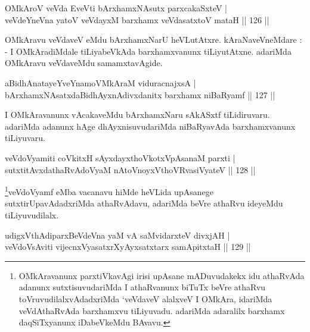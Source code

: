 

\begin{shl}
OMkAroV veVda EveVti bArxhamxNAsutx parxcakaSxteV  | \\
veVdeYneVna yatoV veVdayxM barxhamx veVdasatxtoV mataH \hfill||  126 ||  
\end{shl}

\begin{artha}
OMkAravu veVdaveV eMdu bArxhamxNarU heVLutAtxre. kAraNaveVneMdare : - I OMkAradiMdale tiLiyabeVkAda barxhamxvanunx tiLiyutAtxne. adariMda OMkAravu veVdaveMdu samamxtavAgide.
\end{artha}

\begin{shl}
aBidhAnatayeYveYnamoVMkAraM viduracnajxsA  | \\
bArxhamxNAsatxdaBidhAyxnAdivxdanitx barxhamx niBaRyamf \hfill||  127 ||  
\end{shl}

\begin{artha}
I OMkAravanunx vAcakaveMdu bArxhamxNaru sAkASxtf tiLidiruvaru. adariMda adanunx hAge dhAyxnisuvudariMda niBaRyavAda barxhamxvanunx tiLiyuvaru.
\end{artha}


\begin{shl}
veVdoV\s yamiti coVkitxH sAyxdayxthoVkotxVpAsanaM parxti  | \\
sutxtitAvxdathaRvAdoV\s yaM nAtoV\s noyxV\s thoVR\s vasiVyateV \hfill||  128 ||  
\end{shl}

\begin{artha}
\footnote{OMkAravanunx parxtiVkavAgi irisi upAsane mADuvudakekx idu athaRvAda adanunx sutxtisuvudariMda I athaRvanunx biTuTx beVre athaRvu toVruvudilalxvAdadxriMda `veVdaveV alalxveV I OMkAra, idariMda veVdAthaRvAda barxhamxvu tiLiyuvadu. adariMda adaralilx barxhamx daqSiTxyanunx iDabeVkeMdu BAvavu.}veVdoV\s yamf eMba vacanavu hiMde heVLida upAsanege sutxtirUpavAdadxriMda athaRvAdavu, adariMda beVre athaRvu ideyeMdu tiLiyuvudilalx.
\end{artha}


\begin{shl}
udigxVthAdiparxBeVdeVna yaM vA saMvidarxteV divxjAH  | \\
veVdoV\s sAviti vijecnxVyasatxrXyAyxsatxtarx samApitxtaH \hfill||  129 ||  
\end{shl}

